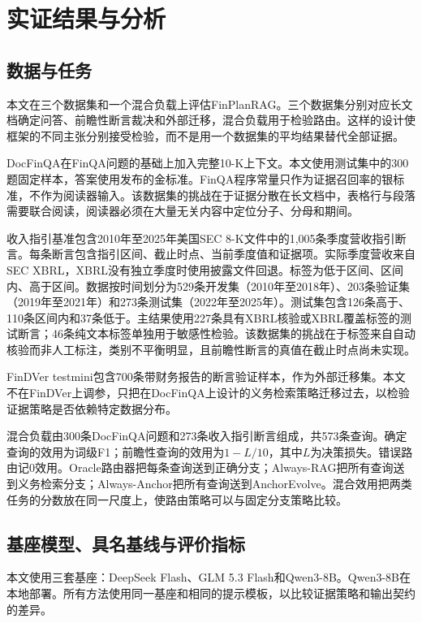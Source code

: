 \chapter{实证结果与分析}
\label{ch:empirical}

\section{数据与任务}

本文在三个数据集和一个混合负载上评估FinPlanRAG。三个数据集分别对应长文档确定问答、前瞻性断言裁决和外部迁移，混合负载用于检验路由。这样的设计使框架的不同主张分别接受检验，而不是用一个数据集的平均结果替代全部证据。

DocFinQA在FinQA问题的基础上加入完整10-K上下文\citep{reddy2024docfinqa}。本文使用测试集中的300题固定样本，答案使用发布的金标准。FinQA程序常量只作为证据召回率的银标准，不作为阅读器输入。该数据集的挑战在于证据分散在长文档中，表格行与段落需要联合阅读，阅读器必须在大量无关内容中定位分子、分母和期间。

收入指引基准包含2010年至2025年美国SEC 8-K文件中的1,005条季度营收指引断言。每条断言包含指引区间、截止时点、当前季度值和证据项。实际季度营收来自SEC XBRL，XBRL没有独立季度时使用披露文件回退。标签为低于区间、区间内、高于区间。数据按时间划分为529条开发集（2010年至2018年）、203条验证集（2019年至2021年）和273条测试集（2022年至2025年）。测试集包含126条高于、110条区间内和37条低于。主结果使用227条具有XBRL核验或XBRL覆盖标签的测试断言；46条纯文本标签单独用于敏感性检验。该数据集的挑战在于标签来自自动核验而非人工标注，类别不平衡明显，且前瞻性断言的真值在截止时点尚未实现。

FinDVer testmini包含700条带财务报告的断言验证样本\citep{zhao2024findver}，作为外部迁移集。本文不在FinDVer上调参，只把在DocFinQA上设计的义务检索策略迁移过去，以检验证据策略是否依赖特定数据分布。

混合负载由300条DocFinQA问题和273条收入指引断言组成，共573条查询。确定查询的效用为词级F1；前瞻性查询的效用为$1-L/10$，其中$L$为决策损失。错误路由记0效用。Oracle路由器把每条查询送到正确分支；Always-RAG把所有查询送到义务检索分支；Always-Anchor把所有查询送到AnchorEvolve。混合效用把两类任务的分数放在同一尺度上，使路由策略可以与固定分支策略比较。

\section{基座模型、具名基线与评价指标}

本文使用三套基座：DeepSeek Flash、GLM 5.3 Flash和Qwen3-8B\citep{qwen2025qwen3}。Qwen3-8B在本地部署。所有方法使用同一基座和相同的提示模板，以比较证据策略和输出契约的差异。

